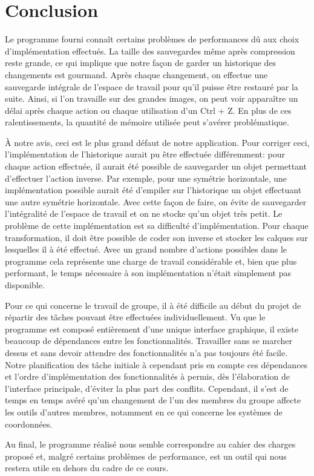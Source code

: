 \section{Conclusion}
Le programme fourni connaît certains problèmes de performances dû aux choix d'implémentation effectués. La taille des sauvegardes même après compression reste grande, ce qui implique que notre façon de garder un historique des changements est gourmand. Après chaque changement, on effectue une sauvegarde intégrale de l'espace de travail pour qu'il puisse être restauré par la suite. Ainsi, si l'on travaille sur des grandes images, on peut voir apparaître un délai après chaque action ou chaque utilisation d'un Ctrl + Z. En plus de ces ralentissements, la quantité de mémoire utilisée peut s'avérer problématique.

À notre avis, ceci est le plus grand défaut de notre application. Pour corriger ceci, l'implémentation de l'historique aurait pu être effectuée différemment: pour chaque action effectuée, il aurait été possible de sauvegarder un objet permettant d'effectuer l'action inverse. Par exemple, pour une symétrie horizontale, une implémentation possible aurait été d'empiler sur l'historique un objet effectuant une autre symétrie horizontale. Avec cette façon de faire, on évite de sauvegarder l'intégralité de l'espace de travail et on ne stocke qu'un objet très petit. Le problème de cette implémentation est sa difficulté d'implémentation. Pour chaque transformation, il doit être possible de coder son inverse et stocker les calques sur lesquelles il à été effectué. Avec un grand nombre d'actions possibles dans le programme cela représente une charge de travail considérable et, bien que plus performant, le temps nécessaire à son implémentation n'était simplement pas disponible.

Pour ce qui concerne le travail de groupe, il à été difficile au début du projet de répartir des tâches pouvant être effectuées individuellement. Vu que le programme est composé entièrement d'une unique interface graphique, il existe beaucoup de dépendances entre les fonctionnalités. Travailler sans se marcher dessus et sans devoir attendre des fonctionnalités n'a pas toujours été facile. Notre planification des tâche initiale à cependant pris en compte ces dépendances et l'ordre d'implémentation des fonctionnalités à permis, dès l'élaboration de l'interface principale, d'éviter la plus part des conflits. Cependant, il s'est de temps en temps avéré qu'un changement de l'un des membres du groupe affecte les outils d'autres membres, notamment en ce qui concerne les systèmes de coordonnées.

Au final, le programme réalisé nous semble correspondre au cahier des charges proposé et, malgré certains problèmes de performance, est un outil qui nous restera utile en dehors du cadre de ce cours.
